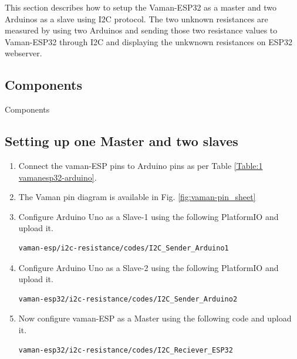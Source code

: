This section describes how to setup the Vaman-ESP32 as a master and two Arduinos
as a slave using I2C protocol. The two unknown resistances are measured by 
using two Arduinos and sending those two resistance values to Vaman-ESP32 
through I2C and displaying the unkwnown resistances on ESP32 webserver.
\subsection{Components}
\begin{table}[!ht]
\centering

\caption{Components}
\label{table:}
\end{table}
\subsection{Setting up one Master and two slaves}
\begin{enumerate}[label=\thesection.\arabic*.,ref=\thesection.\theenumi]
\item
Connect the vaman-ESP pins to Arduino pins as per Table \ref{Table:1 vamanesp32-arduino}.
\begin{table}[!ht]
\centering

\caption{}
\label{Table:1 vamanesp32-arduino}
\end{table}
\item The Vaman pin diagram is available in Fig. \ref{fig:vaman-pin_sheet}
\item
Configure Arduino Uno as a Slave-1 using the following PlatformIO and upload it.
\begin{lstlisting}
vaman-esp/i2c-resistance/codes/I2C_Sender_Arduino1
\end{lstlisting}

\item
Configure Arduino Uno as a Slave-2 using the following PlatformIO and upload it.
\begin{lstlisting}
vaman-esp32/i2c-resistance/codes/I2C_Sender_Arduino2
\end{lstlisting}

\item
Now configure vaman-ESP as a Master using the following code and upload it.
\begin{lstlisting}
vaman-esp32/i2c-resistance/codes/I2C_Reciever_ESP32
\end{lstlisting}
\end{enumerate}
